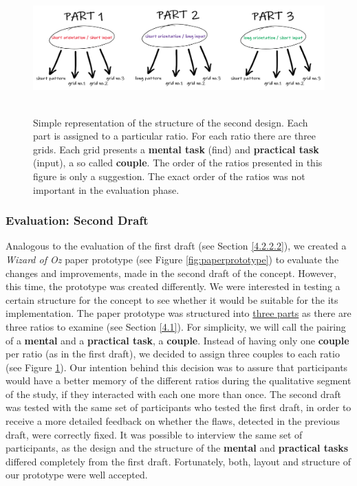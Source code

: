 \begin{figure}[t!]
\centering
\includegraphics[width=13cm, height=5cm]{Chapters/graphics/prototypeStructure.PNG}
\caption{Simple representation of the structure of the second design. Each part is assigned to a particular ratio. For each ratio there are three grids. Each grid presents a \textbf{mental task} (find) and \textbf{practical task} (input), a so called \textbf{couple}. The order of the ratios presented in this figure is only a suggestion. The exact order of the ratios was not important in the evaluation phase.}
\label{fig:prototype}
\end{figure}


\subsubsection{Evaluation: Second Draft} \label{4.2.2.4}

Analogous to the evaluation of the first draft (see Section \ref{4.2.2.2}), we created a \textit{Wizard of Oz} \cite{Butz2014} paper prototype (see Figure \ref{fig:paperprototype}) to evaluate the changes and improvements, made in the second draft of the concept. However, this time, the prototype was created differently. We were interested in testing a certain structure for the concept to see whether it would be suitable for the its implementation. The paper prototype was structured into \underline{three parts} as there are three ratios to examine (see Section \ref{4.1}). For simplicity, we will call the pairing of a  \textbf{mental} and a \textbf{practical task}, a \textbf{couple}. Instead of having only one \textbf{couple} per ratio (as in the first draft), we decided to assign three couples to each ratio (see Figure \ref{fig:prototype}). Our intention behind this decision was to assure that participants would have a better memory of the different ratios during the qualitative segment of the study, if they interacted with each one more than once. The second draft was tested with the same set of participants who tested the first draft, in order to receive a more detailed feedback on whether the flaws, detected in the previous draft, were correctly fixed. It was possible to interview the same set of participants, as the design and the structure of the \textbf{mental} and \textbf{practical tasks} differed completely from the first draft. Fortunately, both, layout and structure of our prototype were well accepted. \\

